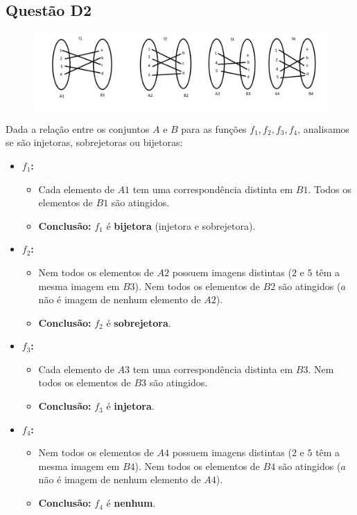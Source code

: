 \documentclass{article}
\begin{document}
\subsection{Questão D2}
\begin{figure}[h]
    \centering
    \includegraphics[width=1\textwidth]{qd2.png} 
    \label{fig:questaoD2}
\end{figure}

Dada a relação entre os conjuntos \(A\) e \(B\) para as funções \(f_1, f_2, f_3, f_4\), analisamos se são injetoras, sobrejetoras ou bijetoras:

\begin{itemize}
    \item \textbf{\(f_1\):}
    \begin{itemize}
        \item Cada elemento de \(A1\) tem uma correspondência distinta em \(B1\). Todos os elementos de \(B1\) são atingidos.
        \item \textbf{Conclusão:} \(f_1\) é \textbf{bijetora} (injetora e sobrejetora).
    \end{itemize}
    \item \textbf{\(f_2\):}
    \begin{itemize}
        \item Nem todos os elementos de \(A2\) possuem imagens distintas (\(2\) e \(5\) têm a mesma imagem em \(B3\)). Nem todos os elementos de \(B2\) são atingidos (\(a\) não é imagem de nenhum elemento de \(A2\)).
        \item \textbf{Conclusão:} \(f_2\) é \textbf{sobrejetora}.
    \end{itemize}
    \item \textbf{\(f_3\):}
    \begin{itemize}
        \item Cada elemento de \(A3\) tem uma correspondência distinta em \(B3\). Nem todos os elementos de \(B3\) são atingidos.
        \item \textbf{Conclusão:} \(f_3\) é \textbf{injetora}.
    \end{itemize}
    \item \textbf{\(f_4\):}
    \begin{itemize}
        \item Nem todos os elementos de \(A4\) possuem imagens distintas (\(2\) e \(5\) têm a mesma imagem em \(B4\)). Nem todos os elementos de \(B4\) são atingidos (\(a\) não é imagem de nenhum elemento de \(A4\)).
        \item \textbf{Conclusão:} \(f_4\) é \textbf{nenhum}.
    \end{itemize}
\end{itemize}
\end{document}
